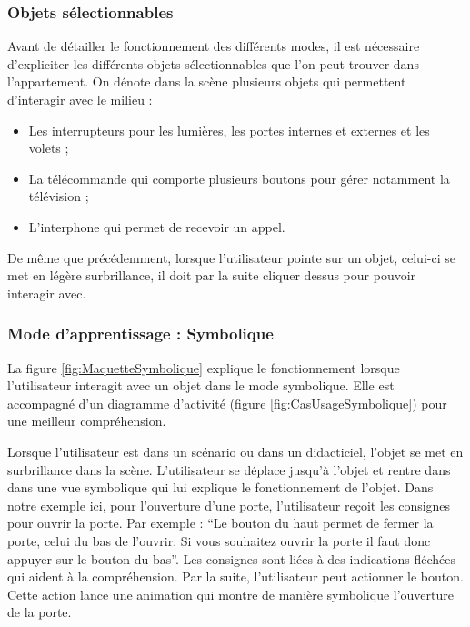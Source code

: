 \subsubsection{Objets sélectionnables}

Avant de détailler le fonctionnement des différents modes, il est nécessaire d'expliciter les différents objets sélectionnables que l'on peut trouver dans l'appartement. On dénote dans la scène plusieurs objets qui permettent d'interagir avec le milieu :
\begin{itemize}
	\item Les interrupteurs pour les lumières, les portes internes et externes et les volets ;
	\item La télécommande qui comporte plusieurs boutons pour gérer notamment la télévision ;
	\item L'interphone qui permet de recevoir un appel.
\end{itemize}

De même que précédemment, lorsque l'utilisateur pointe sur un objet, celui-ci se met en légère surbrillance, il doit par la suite cliquer dessus pour pouvoir interagir avec. %


\subsubsection{Mode d'apprentissage : Symbolique}

La figure \ref{fig:MaquetteSymbolique} explique le fonctionnement lorsque l'utilisateur interagit avec un objet dans le mode symbolique. Elle est accompagné d'un diagramme d'activité (figure \ref{fig:CasUsageSymbolique}) pour une meilleur compréhension.

Lorsque l'utilisateur est dans un scénario ou dans un didacticiel, l'objet se met en surbrillance dans la scène. L'utilisateur se déplace jusqu'à l'objet et rentre dans dans une vue symbolique qui lui explique le fonctionnement de l'objet. Dans notre exemple ici, pour l'ouverture d'une porte, l'utilisateur reçoit les consignes pour ouvrir la porte. Par exemple : \enquote{Le bouton du haut permet de fermer la porte, celui du bas de l'ouvrir. Si vous souhaitez ouvrir la porte il faut donc appuyer sur le bouton du bas}. Les consignes sont liées à des indications fléchées qui aident à la compréhension. Par la suite, l'utilisateur peut actionner le bouton. Cette action lance une animation qui montre de manière symbolique l'ouverture de la porte.

